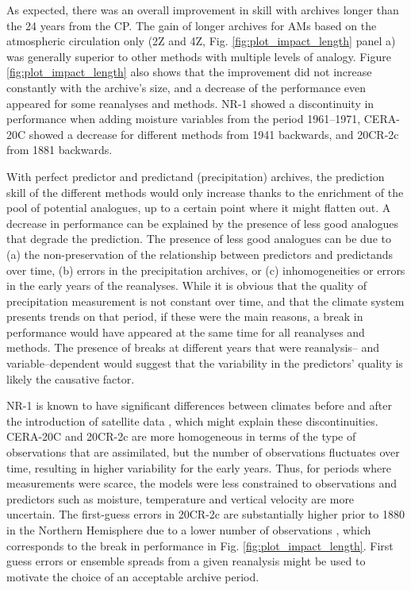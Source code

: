 \documentclass{ametsoc}
\begin{document}
	As expected, there was an overall improvement in skill with archives longer than the 24 years from the CP. The gain of longer archives for AMs based on the atmospheric circulation only (2Z and 4Z, Fig. \ref{fig:plot_impact_length} panel a) was generally superior to other methods with multiple levels of analogy. Figure \ref{fig:plot_impact_length} also shows that the improvement did not increase constantly with the archive's size, and a decrease of the performance even appeared for some reanalyses and methods. NR-1 showed a discontinuity in performance when adding moisture variables from the period 1961--1971, CERA-20C showed a decrease for different methods from 1941 backwards, and 20CR-2c from 1881 backwards.
	
	With perfect predictor and predictand (precipitation) archives, the prediction skill of the different methods would only increase thanks to the enrichment of the pool of potential analogues, up to a certain point where it might flatten out. A decrease in performance can be explained by the presence of less good analogues that degrade the prediction. The presence of less good analogues can be due to (a) the non-preservation of the relationship between predictors and predictands over time, (b) errors in the precipitation archives, or (c) inhomogeneities or errors in the early years of the reanalyses. While it is obvious that the quality of precipitation measurement is not constant over time, and that the climate system presents trends on that period, if these were the main reasons, a break in performance would have appeared at the same time for all reanalyses and methods. The presence of breaks at different years that were reanalysis-- and variable--dependent would suggest that the variability in the predictors' quality is likely the causative factor.
	
	NR-1 is known to have significant differences between climates before and after the introduction of satellite data \citep{Kistler2001}, which might explain these discontinuities. CERA-20C and 20CR-2c are more homogeneous in terms of the type of observations that are assimilated, but the number of observations fluctuates over time, resulting in higher variability for the early years. Thus, for periods where measurements were scarce, the models were less constrained to observations and predictors such as moisture, temperature and vertical velocity are more uncertain. The first-guess errors in 20CR-2c are substantially higher prior to 1880 in the Northern Hemisphere due to a lower number of observations \citep{Compo2011}, which corresponds to the break in performance in Fig. \ref{fig:plot_impact_length}. First guess errors or ensemble spreads from a given reanalysis might be used to motivate the choice of an acceptable archive period.
	
\end{document}
